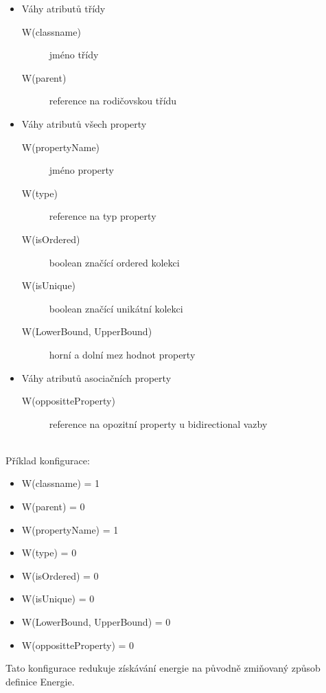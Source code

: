 \documentclass[11pt,twoside,a4paper]{book}
\begin{document}
\begin{itemize}\label{algo:state:attribute_list}
   \item Váhy atributů třídy
   \begin{description}
      \item[W(classname)] jméno třídy
      \item[W(parent)] reference na rodičovskou třídu 
   \end{description}
   \item Váhy atributů všech property
   \begin{description}
      \item[W(propertyName)] jméno property
      \item[W(type)] reference na typ property
      \item[W(isOrdered)] boolean značící ordered kolekci
      \item[W(isUnique)] boolean značící unikátní kolekci
      \item[W(LowerBound, UpperBound)] horní a dolní mez hodnot property
   \end{description}
   \item Váhy atributů asociačních property
   \begin{description}
      \item[W(oppositteProperty)] reference na opozitní property u bidirectional
      vazby
   \end{description}
\end{itemize}

\ \\
Příklad konfigurace:
\begin{itemize}
      \item W(classname) = 1
      \item W(parent) = 0 
      \item W(propertyName) = 1
      \item W(type) = 0
      \item W(isOrdered) = 0
      \item W(isUnique) = 0
      \item W(LowerBound, UpperBound) = 0
      \item W(oppositteProperty) = 0
\end{itemize}

Tato konfigurace redukuje získávání energie na původně zmiňovaný způsob definice
Energie.
\end{document}
